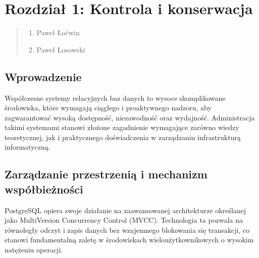 \documentclass[letterpaper,10pt,english]{sphinxmanual}
\begin{document}
\sphinxstepscope


\chapter{Rozdział 1: Kontrola i konserwacja}
\label{\detokenize{rozdzial_1/index:rozdzial-1-kontrola-i-konserwacja}}\label{\detokenize{rozdzial_1/index::doc}}\begin{quote}\begin{description}
\begin{enumerate}
%
\item {} 
\sphinxAtStartPar
Paweł Łoćwin

\item {} 
\sphinxAtStartPar
Paweł Łosowski

\end{enumerate}

\end{description}\end{quote}


\section{Wprowadzenie}
\label{\detokenize{rozdzial_1/index:wprowadzenie}}
\sphinxAtStartPar
Współczesne systemy relacyjnych baz danych to wysoce skomplikowane środowiska, które wymagają ciągłego i proaktywnego nadzoru, aby zagwarantować wysoką dostępność, niezawodność oraz wydajność. Administracja takimi systemami stanowi złożone zagadnienie wymagające zarówno wiedzy teoretycznej, jak i praktycznego doświadczenia w zarządzaniu infrastrukturą informatyczną.


\section{Zarządzanie przestrzenią i mechanizm współbieżności}
\label{\detokenize{rozdzial_1/index:zarzadzanie-przestrzenia-i-mechanizm-wspolbieznosci}}
\sphinxAtStartPar
PostgreSQL opiera swoje działanie na zaawansowanej architekturze określanej jako Multi\sphinxhyphen{}Version Concurrency Control (MVCC). Technologia ta pozwala na równoległy odczyt i zapis danych bez wzajemnego blokowania się transakcji, co stanowi fundamentalną zaletę w środowiskach wieloużytkownikowych o wysokim natężeniu operacji.
\end{document}
